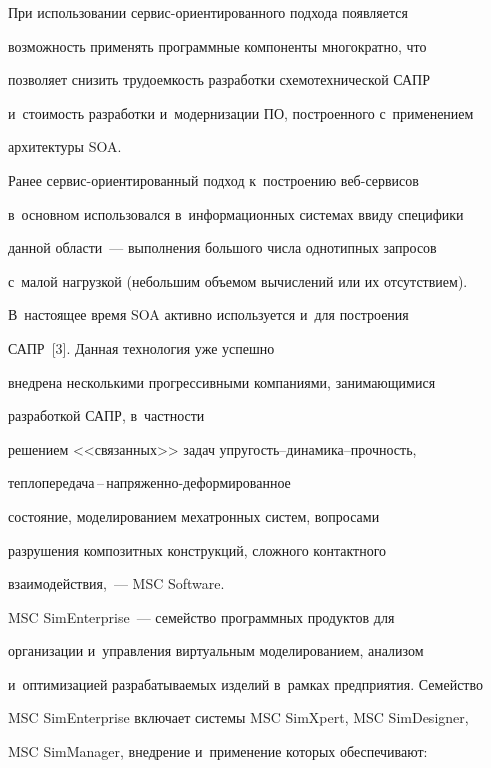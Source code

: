      При использовании сервис-ориентированного подхода появляется 


возможность применять программные компоненты многократно, что 


позволяет снизить трудоемкость разработки схемотехнической САПР 


и~стоимость разработки и~модернизации ПО, построенного с~применением 


архитектуры SOA.


     


     Ранее сервис-ориентированный подход к~построению веб-сер\-ви\-сов 


в~основном использовался в~информационных системах ввиду специфики 


данной области~--- выполнения большого числа однотипных запросов 


с~малой нагрузкой (небольшим объемом вычислений или их отсутствием). 


В~настоящее время SOA активно используется и~для построения 


САПР~[3]. Данная технология уже успешно 


внедрена несколькими прогрессивными компаниями, занимающимися 


разработкой САПР, в~част\-ности 


решением <<связанных>> задач упру\-гость--ди\-на\-ми\-ка--проч\-ность, 


теп\-ло\-пе\-ре\-да\-ча\,--\,на\-пря\-жен\-но-де\-фор\-ми\-ро\-ван\-ное 


со\-сто\-яние, моделированием мехатронных сис\-тем, вопросами 


разрушения композитных конструкций, слож\-но\-го контактного 


взаимодействия,~--- MSC Software. 


     


     MSC SimEnterprise~--- семейство программных продуктов для 


организации и~управления виртуальным моделированием, анализом 


и~оптимизацией разрабатываемых изделий в~рамках предприятия. Семейство 


MSC SimEnterprise включает системы MSC SimXpert, MSC SimDesigner, 


MSC SimManager, внед\-ре\-ние и~применение которых обеспечивают:


